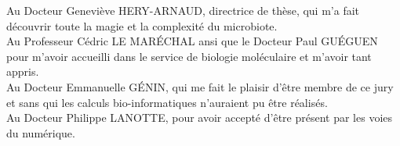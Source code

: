 \documentclass[12pt,a4paper]{article}
\begin{document}
Au Docteur Geneviève HERY-ARNAUD, directrice de thèse, qui m'a fait découvrir toute la magie et la complexité du microbiote.\\

Au Professeur Cédric LE MARÉCHAL ansi que le Docteur Paul GUÉGUEN pour m'avoir accueilli dans le service de biologie moléculaire et m'avoir tant appris. \\

Au Docteur Emmanuelle GÉNIN, qui me fait le plaisir d'être membre de ce jury et sans qui les calculs bio-informatiques n'auraient pu être réalisés.\\


Au Docteur Philippe LANOTTE, pour avoir accepté d'être présent par les voies du numérique.

\newpage
\thispagestyle{empty}
\setcounter{page}{0}
\thispagestyle{empty}
\end{document}
